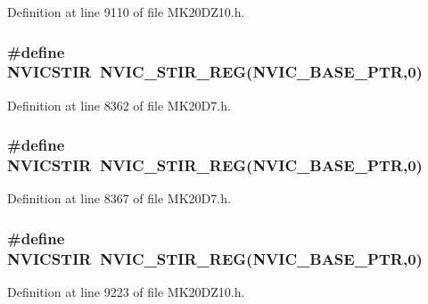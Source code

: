 Definition at line 9110 of file M\+K20\+D\+Z10.\+h.

\subsubsection[{\texorpdfstring{N\+V\+I\+C\+S\+T\+IR}{NVICSTIR}}]{\setlength{\rightskip}{0pt plus 5cm}\#define N\+V\+I\+C\+S\+T\+IR~{\bf N\+V\+I\+C\+\_\+\+S\+T\+I\+R\+\_\+\+R\+EG}({\bf N\+V\+I\+C\+\_\+\+B\+A\+S\+E\+\_\+\+P\+TR},0)}\hypertarget{group___n_v_i_c___register___accessor___macros_ga8bf423e492b27186c6ad28e2a936b2d1}{}\label{group___n_v_i_c___register___accessor___macros_ga8bf423e492b27186c6ad28e2a936b2d1}


Definition at line 8362 of file M\+K20\+D7.\+h.

\subsubsection[{\texorpdfstring{N\+V\+I\+C\+S\+T\+IR}{NVICSTIR}}]{\setlength{\rightskip}{0pt plus 5cm}\#define N\+V\+I\+C\+S\+T\+IR~{\bf N\+V\+I\+C\+\_\+\+S\+T\+I\+R\+\_\+\+R\+EG}({\bf N\+V\+I\+C\+\_\+\+B\+A\+S\+E\+\_\+\+P\+TR},0)}\hypertarget{group___n_v_i_c___register___accessor___macros_ga8bf423e492b27186c6ad28e2a936b2d1}{}\label{group___n_v_i_c___register___accessor___macros_ga8bf423e492b27186c6ad28e2a936b2d1}


Definition at line 8367 of file M\+K20\+D7.\+h.

\subsubsection[{\texorpdfstring{N\+V\+I\+C\+S\+T\+IR}{NVICSTIR}}]{\setlength{\rightskip}{0pt plus 5cm}\#define N\+V\+I\+C\+S\+T\+IR~{\bf N\+V\+I\+C\+\_\+\+S\+T\+I\+R\+\_\+\+R\+EG}({\bf N\+V\+I\+C\+\_\+\+B\+A\+S\+E\+\_\+\+P\+TR},0)}\hypertarget{group___n_v_i_c___register___accessor___macros_ga8bf423e492b27186c6ad28e2a936b2d1}{}\label{group___n_v_i_c___register___accessor___macros_ga8bf423e492b27186c6ad28e2a936b2d1}


Definition at line 9223 of file M\+K20\+D\+Z10.\+h.

